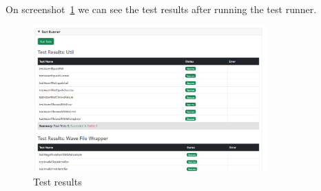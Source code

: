 On screenshot~\ref{fig:test-results} we can see the test results after running the test runner.
\begin{figure}[H]
    \centering
    \includegraphics[width=0.8\textwidth]{../assets/test_results.png}
    \caption{Test results}\label{fig:test-results}
\end{figure}
